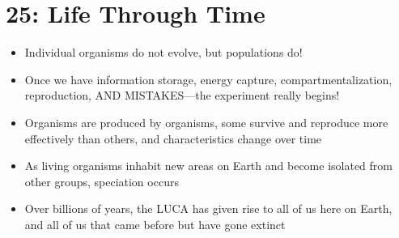 \documentclass[
]{report}
\providecommand{\tightlist}{%
  \setlength{\itemsep}{0pt}\setlength{\parskip}{0pt}}
\providecommand{\tightlist}{%
  \setlength{\itemsep}{0pt}\setlength{\parskip}{0pt}}
\begin{document}
\hypertarget{life-through-time}{%
\section*{25: Life Through Time}\label{life-through-time}}

\begin{itemize}
\tightlist
\item
  Individual organisms do not evolve, but populations do!
\item
  Once we have information storage, energy capture, compartmentalization, reproduction, AND MISTAKES---the experiment really begins!
\item
  Organisms are produced by organisms, some survive and reproduce more effectively than others, and characteristics change over time
\item
  As living organisms inhabit new areas on Earth and become isolated from other groups, speciation occurs
\item
  Over billions of years, the LUCA has given rise to all of us here on Earth, and all of us that came before but have gone extinct
\end{itemize}
\end{document}
